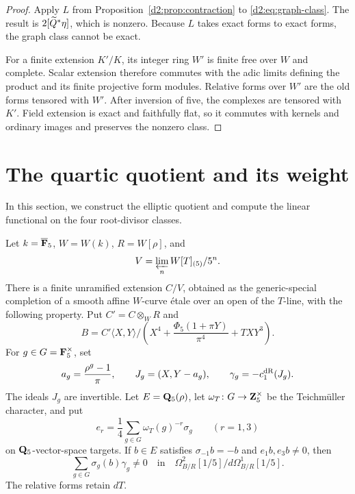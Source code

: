 \begin{proof}
Apply \(L\) from Proposition~\ref{d2:prop:contraction} to
\eqref{d2:eq:graph-class}.
The result is \(2[\widetilde Q^*\eta]\), which is nonzero.
Because \(L\) takes exact forms to exact forms, the graph class
cannot be exact.

For a finite extension \(K'/K\), its integer ring \(W'\) is finite
free over \(W\) and complete.
Scalar extension therefore commutes with the adic limits defining
the product and its finite projective form modules.
Relative forms over \(W'\) are the old forms tensored with \(W'\).
After inversion of five, the complexes are tensored with \(K'\).
Field extension is exact and faithfully flat, so it commutes with
kernels and ordinary images and preserves the nonzero class.
\end{proof}

\section{The quartic quotient and its weight}\label{d2:sec:quartic}

In this section, we construct the elliptic quotient and compute the
linear functional on the four root-divisor classes.

\begin{proposition}\label{d2:prop:weighted}
Let \(k=\overline{\mathbf{F}}_5\), \(W=W(k)\), \(R=W[\rho]\), and
\[
 V=\varprojlim_n W[T]_{(5)}/5^n.
\]
There is a finite unramified extension \(C/V\), obtained as the
generic-special completion of a smooth affine \(W\)-curve \'etale
over an open of the \(T\)-line, with the following property.
Put \(C'=C\otimes_WR\) and
\[
 B=C'\langle X,Y\rangle/
 \left(X^4+\frac{\Phi_5(1+\pi Y)}{\pi^4}+TXY^3\right).
\]
For \(g\in G=\mathbf{F}_5^\times\), set
\[
 a_g=\frac{\rho^g-1}{\pi},\qquad
 J_g=(X,Y-a_g),\qquad
 \gamma_g=-c_1^{\mathrm{dR}}(J_g).
\]
The ideals \(J_g\) are invertible.
Let \(E=\mathbf{Q}_5(\rho)\), let
\(\omega_T\colon G\to\mathbf{Z}_5^\times\) be the Teichm\"uller character,
and put
\[
 e_r=\frac14\sum_{g\in G}\omega_T(g)^{-r}\sigma_g
 \qquad(r=1,3)
\]
on \(\mathbf{Q}_5\)-vector-space targets.
If \(b\in E\) satisfies
\(\sigma_{-1}b=-b\) and \(e_1b,e_3b\ne0\), then
\[
 \sum_{g\in G}\sigma_g(b)\gamma_g\ne0
 \quad\text{in}\quad
 \Omega^2_{B/R}[1/5]\big/d\Omega^1_{B/R}[1/5].
\]
The relative forms retain \(dT\).
\end{proposition}

